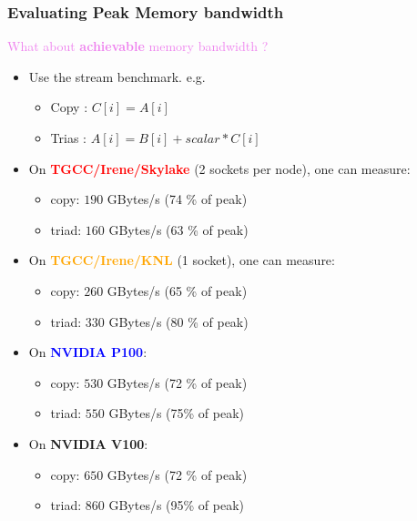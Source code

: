 \begin{frame}
  \frametitle{Evaluating Peak Memory bandwidth}

  \textcolor{violet}{\Large What about {\bf achievable} memory bandwidth ?}

  \begin{itemize}
  \item Use the stream benchmark. e.g. 
    \begin{itemize}
    \item Copy : $C[i] = A[i]$
    \item Trias : $A[i] = B[i] + scalar * C[i]$
    \end{itemize}
  \item On \textcolor{red}{\bf TGCC/Irene/Skylake} (2 sockets per node), one can measure:
    \begin{itemize}
    \item copy: $190$ GBytes/s (74 \% of peak)
    \item triad: $160$ GBytes/s (63 \% of peak)
    \end{itemize}
  \item On \textcolor{orange}{\bf TGCC/Irene/KNL} (1 socket), one can measure:
    \begin{itemize}
    \item copy: $260$ GBytes/s (65 \% of peak)
    \item triad: $330$ GBytes/s (80 \% of peak)
    \end{itemize}
  \item On \textcolor{blue}{\bf NVIDIA P100}:
    \begin{itemize}
    \item copy: $530$ GBytes/s (72 \% of peak)
    \item triad: $550$ GBytes/s (75\% of peak)
    \end{itemize}    
  \item On \textcolor{RoyalPurple}{\bf NVIDIA V100}:
    \begin{itemize}
    \item copy: $650$ GBytes/s (72 \% of peak)
    \item triad: $860$ GBytes/s (95\% of peak)
    \end{itemize}    
  \end{itemize}

\end{frame}